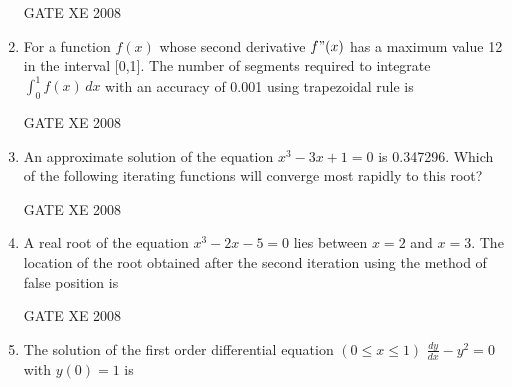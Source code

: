 \documentclass[12pt]{article}
\begin{document}
\begin{enumerate}[label=Q\arabic*.]
GATE XE 2008
\item For a function $f(x)$ whose second derivative $f"(x)$ has a maximum value 12 in the interval [0,1]. The number of segments required to integrate $\int_{0}^{1} f(x) \,dx$
with an accuracy of 0.001 using trapezoidal rule is

\begin{enumerate}[label=(\Alph*)]
\end{enumerate}

GATE XE 2008
\item  An approximate solution of the equation $x^3 - 3x+1=0$ is 0.347296. Which of the following iterating functions will converge most rapidly to this root?

\begin{enumerate}[label=(\Alph*)]
\end{enumerate}

GATE XE 2008
\item  A real root of the equation $x^3 -2x-5 =0$ lies between $x=2$ and $x = 3$. The location of the root obtained after the second iteration using the method of false position is

\begin{enumerate}[label=(\Alph*)]
\end{enumerate}

GATE XE 2008
\item The solution of the first order differential equation $(0\leq x\leq1)$\newline
$\frac{dy}{dx} - y^2 =0$ with $y(0)=1$ is


\end{enumerate}
\end{document}
